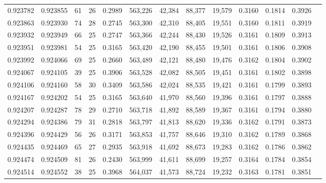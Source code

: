 \begin{tabular}{rrrrrrrrrrrrr}
0.923782 & 0.923855 &    61 &  26 &                                     0.2989 & 563,226 &  42,384 &  88,377 &  19,579 & 0.3160 & 0.1814 & 0.3926 \\
0.923863 & 0.923930 &    74 &  28 &                                     0.2745 & 563,300 &  42,310 &  88,405 &  19,551 & 0.3160 & 0.1811 & 0.3919 \\
0.923932 & 0.923949 &    66 &  25 &                                     0.2747 & 563,366 &  42,244 &  88,430 &  19,526 & 0.3161 & 0.1809 & 0.3913 \\
0.923951 & 0.923981 &    54 &  25 &                                     0.3165 & 563,420 &  42,190 &  88,455 &  19,501 & 0.3161 & 0.1806 & 0.3908 \\
0.923992 & 0.924066 &    69 &  25 &                                     0.2660 & 563,489 &  42,121 &  88,480 &  19,476 & 0.3162 & 0.1804 & 0.3902 \\
0.924067 & 0.924105 &    39 &  25 &                                     0.3906 & 563,528 &  42,082 &  88,505 &  19,451 & 0.3161 & 0.1802 & 0.3898 \\
0.924106 & 0.924160 &    58 &  30 &                                     0.3409 & 563,586 &  42,024 &  88,535 &  19,421 & 0.3161 & 0.1799 & 0.3893 \\
0.924167 & 0.924202 &    54 &  25 &                                     0.3165 & 563,640 &  41,970 &  88,560 &  19,396 & 0.3161 & 0.1797 & 0.3888 \\
0.924207 & 0.924287 &    78 &  29 &                                     0.2710 & 563,718 &  41,892 &  88,589 &  19,367 & 0.3161 & 0.1794 & 0.3880 \\
0.924294 & 0.924386 &    79 &  31 &                                     0.2818 & 563,797 &  41,813 &  88,620 &  19,336 & 0.3162 & 0.1791 & 0.3873 \\
0.924396 & 0.924429 &    56 &  26 &                                     0.3171 & 563,853 &  41,757 &  88,646 &  19,310 & 0.3162 & 0.1789 & 0.3868 \\
0.924435 & 0.924469 &    65 &  27 &                                     0.2935 & 563,918 &  41,692 &  88,673 &  19,283 & 0.3162 & 0.1786 & 0.3862 \\
0.924474 & 0.924509 &    81 &  26 &                                     0.2430 & 563,999 &  41,611 &  88,699 &  19,257 & 0.3164 & 0.1784 & 0.3854 \\
0.924514 & 0.924552 &    38 &  25 &                                     0.3968 & 564,037 &  41,573 &  88,724 &  19,232 & 0.3163 & 0.1781 & 0.3851 \\

\end{tabular}
